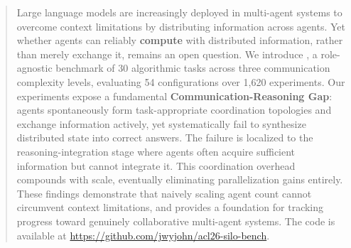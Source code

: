 \begin{abstract}
Large language models are increasingly deployed in multi-agent systems to overcome context limitations by distributing information across agents. 
Yet whether agents can reliably \textbf{compute} with distributed information, rather than merely exchange it, remains an open question. 
We introduce \silobench{}, a role-agnostic benchmark of 30 algorithmic tasks across three communication complexity levels, evaluating 54 configurations over 1,620 experiments. 
Our experiments expose a fundamental \textbf{Communication-Reasoning Gap}: agents spontaneously form task-appropriate coordination topologies and exchange information actively, yet systematically fail to synthesize distributed state into correct answers. 
The failure is localized to the reasoning-integration stage where agents often acquire sufficient information but cannot integrate it. 
This coordination overhead compounds with scale, eventually eliminating parallelization gains entirely. 
These findings demonstrate that naively scaling agent count cannot circumvent context limitations, and \silobench{} provides a foundation for tracking progress toward genuinely collaborative multi-agent systems. 
The code is available at \href{https://github.com/jwyjohn/acl26-silo-bench}{https://github.com/jwyjohn/acl26-silo-bench}.
\end{abstract}


